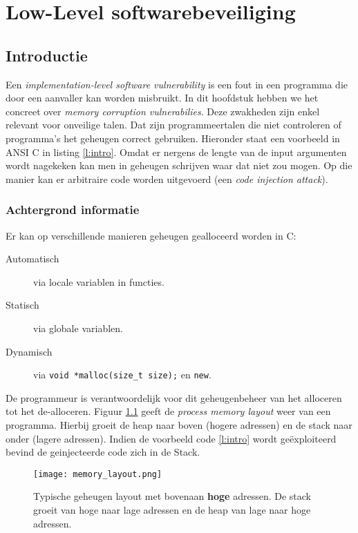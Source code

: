 \documentclass[../main.tex]{subfiles}
\begin{document}
\chapter{Low-Level softwarebeveiliging}
\section{Introductie}
Een \emph{implementation-level software vulnerability} is een fout in een programma die door een aanvaller kan worden misbruikt.
In dit hoofdstuk hebben we het concreet over \emph{memory corruption vulnerabilies}.
Deze zwakheden zijn enkel relevant voor onveilige talen.
Dat zijn programmeertalen die niet controleren of programma's het geheugen correct gebruiken.
Hieronder staat een voorbeeld in ANSI C in listing \ref{l:intro}. Omdat er nergens de lengte van de input argumenten wordt nagekeken kan men in geheugen schrijven waar dat niet zou mogen.
Op die manier kan er arbitraire code worden uitgevoerd (een \emph{code injection attack}).



\subsection{Achtergrond informatie}
Er kan op verschillende manieren geheugen gealloceerd worden in C:
\begin{description}
	\item[Automatisch] via locale variablen in functies.
	\item[Statisch] via globale variablen.
	\item[Dynamisch] via \lstinline[style=ilcstyle]{void *malloc(size_t size);} en \lstinline[style=ilcstyle]{new}.
\end{description}
De programmeur is verantwoordelijk voor dit geheugenbeheer van het alloceren tot het de-alloceren.
Figuur \ref{f:mem_lay} geeft de \emph{process memory layout} weer van een programma.
Hierbij groeit de heap naar boven (hogere adressen) en de stack naar onder (lagere adressen).
Indien de voorbeeld code \ref{l:intro} wordt ge\"exploiteerd bevind de geinjecteerde code zich in de Stack.
\begin{figure}
\centering
\texttt{[image: memory\_layout.png]}
\caption{Typische geheugen layout met bovenaan \textbf{hoge} adressen. De stack groeit van hoge naar lage adressen en de heap van lage naar hoge adressen.}
\label{f:mem_lay}
\end{figure}
\end{document}
